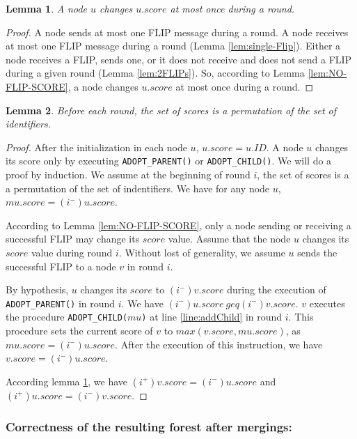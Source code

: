 \documentclass[twocolumn]{article}
\newtheorem{lemma}{Lemma}
\newcommand{\depends}[1]{}
\newcommand{\state}[3]{\ensuremath{(#2^{#3})#1}}
\newcommand{\uim}{\state{u}{i}{-}}
\newcommand{\vim}{\state{v}{i}{-}}
\newcommand{\uip}{\state{u}{i}{+}}
\newcommand{\vip}{\state{v}{i}{+}}
\begin{document}
\begin{lemma}
  \label{lem:change_score-once}
A node $u$ changes $u.score$ at most once during a round.
\depends{\ref{lem:NO-FLIP-SCORE}, \red{lem:single-Flip}, \ref{lem:2FLIPs}}
\end{lemma}

\begin{proof}
A node sends at most one  FLIP message during a round.
A node receives at most one FLIP message during a round 
(Lemma \ref{lem:single-Flip}).
Either a node receives a FLIP, sends one, or it does not receive and does not send a FLIP during a given
round (Lemma \ref{lem:2FLIPs}).
So, according to Lemma \ref{lem:NO-FLIP-SCORE}, 
a node changes $u.score$ at most once during a round.
 \end{proof}

\begin{lemma}
  \label{lem:permutation}
  Before each round, the set of scores is a permutation of the set of identifiers. 
\depends{\ref{lem:change_score_once}}
\end{lemma}

\begin{proof}
After the initialization in each node $u$, $u.score=u.ID$. A node $u$ changes its score only by executing \texttt{ADOPT\_PARENT()} or \texttt{ADOPT\_CHILD()}.
We will do a proof by induction.
We assume at the beginning of round $i$, the set of scores is a a permutation of the set of indentifiers.
We have for any node $u$, $mu.score=\uim.score$.

According to Lemma \ref{lem:NO-FLIP-SCORE}, only a node sending or receiving a successful FLIP may change its $score$ value. 
Assume that the node $u$ changes its $score$ value during round $i$. Without lost of generality, we assume $u$
sends the successful FLIP to a node $v$ in round $i$.

By hypothesis, $u$ changes its $score$ to $\vim.score$ during the execution of \texttt{ADOPT\_PARENT()} in round $i$. We have $\uim.score \ geq \vim.score$. 
$v$ executes the procedure
\texttt{ADOPT\_CHILD($mu$)} at line \ref{line:addChild} 
in round $i$. 
This procedure sets the current score of $v$ 
to $max(v.score,mu.score)$, as $mu.score=\uim.score$.
After the execution of this instruction, we have
$ v.score=\uim.score$. 

According lemma \ref{lem:change_score-once}, we have 
$\vip.score=\uim.score$ and $\uip.score=\vim.score$. 
\end{proof}


\subsubsection{Correctness of the resulting forest after mergings:}
\end{document}
